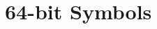 \hypertarget{group__SixtyFourBitSupport}{}\section{64-\/bit Symbols}
\label{group__SixtyFourBitSupport}
